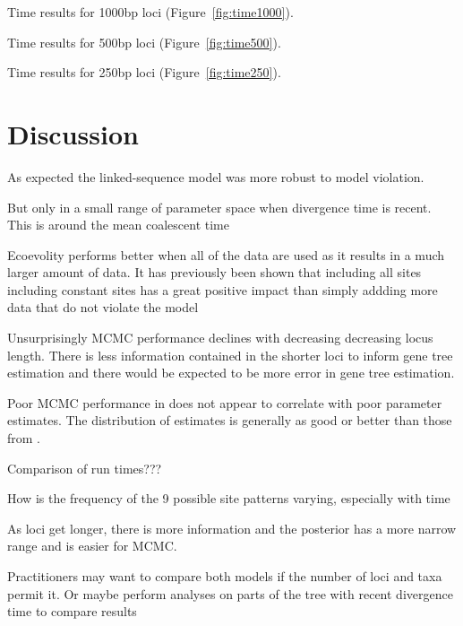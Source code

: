 Time results for 1000bp loci (Figure~\ref{fig:time1000}).

Time results for 500bp loci (Figure~\ref{fig:time500}).

Time results for 250bp loci (Figure~\ref{fig:time250}).

\section{Discussion}

As expected the linked-sequence model was more robust to model violation.

But only in a small range of parameter space when divergence time is recent. This
is around the mean coalescent time

Ecoevolity performs better when all of the data are used as it results in a much larger 
amount of data. It has previously been shown that including all sites including 
constant sites has a great positive impact than simply addding more data that 
do not violate the model \citep{Oaks2018ecoevolity}

Unsurprisingly MCMC performance declines with decreasing decreasing locus length.
There is less information contained in the shorter loci to inform gene tree estimation 
and there would be expected to be more error in gene tree estimation.

Poor MCMC performance in \beast does not appear to correlate with poor parameter 
estimates. The distribution of estimates is generally as good or better than those 
from \ecoevolity. 

Comparison of run times???

How is the frequency of the 9 possible site patterns varying, especially with time

As loci get longer, there is more information and the posterior has a more 
narrow range and is easier for MCMC.

Practitioners may want to compare both models if the number of loci and taxa
permit it. Or maybe perform analyses on parts of the tree with recent divergence
time to compare results 
